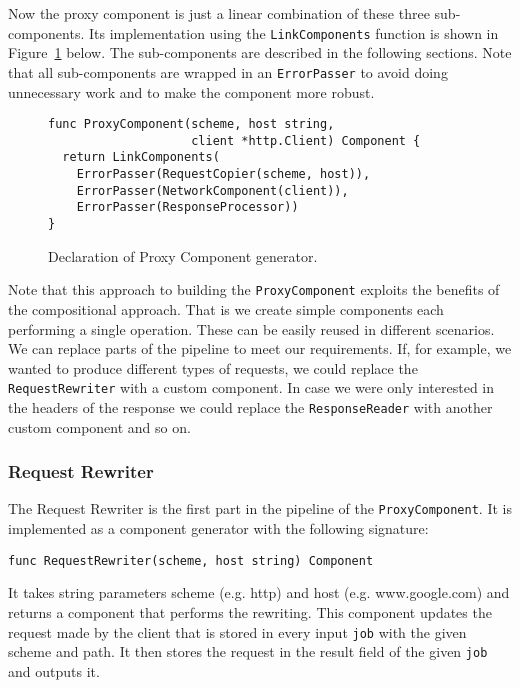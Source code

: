 Now the proxy component is just a linear combination of these three
sub-components. Its implementation using the \texttt{LinkComponents}
function is shown in Figure~\ref{fig:ProxyComp} below. 
The sub-components are described in the
following sections. Note that all sub-components are wrapped
in an \texttt{ErrorPasser} to avoid doing unnecessary work 
and to make the component more robust.

\begin{figure}[h]
\centering
\begin{lstlisting}
func ProxyComponent(scheme, host string, 
                    client *http.Client) Component {
  return LinkComponents(
    ErrorPasser(RequestCopier(scheme, host)),
    ErrorPasser(NetworkComponent(client)),
    ErrorPasser(ResponseProcessor))
}
\end{lstlisting}
\caption[scale=1.0]{Declaration of Proxy Component generator.}
\label{fig:ProxyComp}
\end{figure}

Note that this approach to building the \texttt{ProxyComponent} exploits
the benefits of the compositional approach. That is we create simple
components each performing a single operation. These can be easily
reused in different scenarios. We can replace parts of the pipeline 
to meet our requirements. If, for example, we wanted to produce different
types of requests, we could replace the \texttt{RequestRewriter} with
a custom component. In case we were only interested in the headers of
the response we could replace the \texttt{ResponseReader} with another 
custom component and so on.

\subsubsection{Request Rewriter}
The Request Rewriter is the first part in the pipeline of the 
\texttt{ProxyComponent}. It is implemented as a component generator with the 
following signature:
\begin{lstlisting}
func RequestRewriter(scheme, host string) Component
\end{lstlisting}
It takes string parameters scheme (e.g. http) and host (e.g. www.google.com) 
and returns a component that performs the rewriting. This component
updates the request made by the client that is stored in every input 
\texttt{job} with the given scheme and path. It then stores the 
request in the result field of the given \texttt{job} and outputs it.

